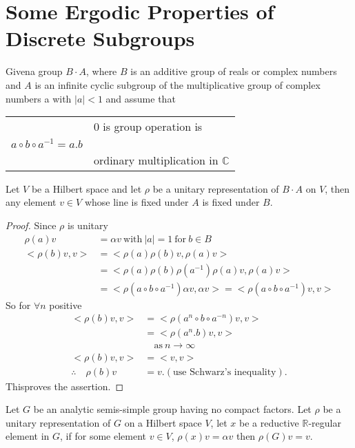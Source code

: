 
\chapter{Some Ergodic Properties of Discrete Subgroups}\label{chap5}

\begin{lemma}[Mautner]\label{chap5:lem5.1}
  Given\pageoriginale a group $B \cdot A$, where $B$ is an additive group of reals
  or complex numbers and $A$ is an infinite cyclic subgroup of the
  multiplicative group of complex numbers a with $|a|<1$ and assume
  that

  \medskip
  \begin{tabular}{ll}
    & 0 is group operation is\\
    $a \circ b \circ a^{-1}= a. b$ & \\
    & ordinary multiplication in $\mathbb{C}$
  \end{tabular}
\end{lemma}

Let $V$ be a Hilbert space and let $\rho$ be a unitary representation
of $B \cdot A$ on $V$, then any element $v \in V$ whose line is fixed
under $A$ is fixed under $B$.

\begin{proof}
  Since $\rho$ is unitary
  \begin{align*}
    \rho (a) v & = \alpha v ~\text{with}~ |a|=1 ~\text{for}~ b \in B\\
    <\rho (b) v, v> & = <\rho(a) \rho (b) v, \rho (a) v>\\
    & = <\rho (a) \rho(b) \rho(a^{-1}) \rho (a) v, \rho (a) v>\\
    & = <\rho (a \circ b \circ a^{-1}) \alpha v, \alpha v> = <\rho (a
    \circ b \circ a^{-1}) v, v>
  \end{align*}
  So for $\forall n$ positive
  \begin{align*}
    <\rho (b)v, v> & = <\rho (a^n \circ b \circ a^{-n}) v, v>\\
    & = <\rho (a^n . b) v, v>\\
    & \quad \text{as}~ n \to \infty\\
    <\rho (b) v, v> & = <v, v>\\
    \therefore \quad \rho (b) v & = v. (\text{use Schwarz's inequality}).
  \end{align*}
  This\pageoriginale proves the assertion.
\end{proof}

\begin{lemma} \label{chap5:lem5.2}
  Let $G$ be an analytic semis-simple group having no compact
  factors. Let $\rho$ be a unitary representation of $G$ on a Hilbert
  space $V$, let $x$ be a reductive $\mathbb{R}$-regular element in
  $G$, if for some element $v \in V$, $\rho (x)v= \alpha v$ then $\rho
  (G)v=v$.
\end{lemma}

